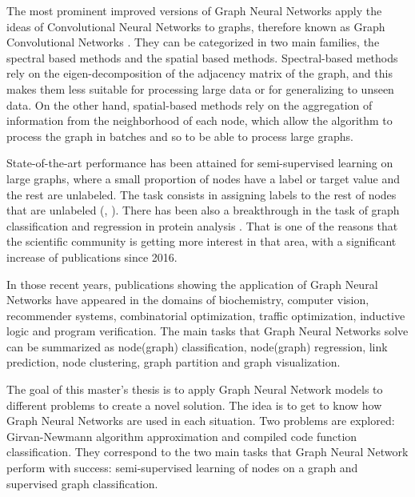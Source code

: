 The most prominent improved versions of Graph Neural Networks apply the ideas of Convolutional Neural Networks to graphs, therefore known as Graph Convolutional Networks \cite{gcn}. They can be categorized in two main families, the spectral based methods and the spatial based methods. Spectral-based methods rely on the eigen-decomposition of the adjacency matrix of the graph, and this makes them less suitable for processing large data or for generalizing to unseen data. On the other hand, spatial-based methods rely on the aggregation of information from the neighborhood of each node, which allow the algorithm to process the graph in batches and so to be able to process large graphs.



State-of-the-art performance has been attained for semi-supervised learning on large graphs, where a small proportion of nodes have a label or target value and the rest are unlabeled. The task consists in assigning labels to the rest of nodes that are unlabeled (\cite{gcn}, \cite{graphsage}). There has been also a breakthrough in the task of graph classification and regression in protein analysis \cite{zhang2018end}. That is one of the reasons that the scientific community is getting more interest in that area, with a significant increase of publications since 2016.

In those recent years, publications showing the application of Graph Neural Networks have appeared in the domains of biochemistry, computer vision, recommender systems, combinatorial optimization, traffic optimization, inductive logic and program verification. The main tasks that Graph Neural Networks solve can be summarized as node(graph) classification, node(graph) regression, link prediction,  node clustering, graph partition and graph visualization.

	

The goal of this master's thesis is to apply Graph Neural Network models to different problems to create a novel solution. The idea is to get to know how Graph Neural Networks are used in each situation. Two problems are explored: Girvan-Newmann algorithm approximation and compiled code function classification. They correspond to the two main tasks that Graph Neural Network perform with success: semi-supervised learning of nodes on a graph and supervised graph classification. 



